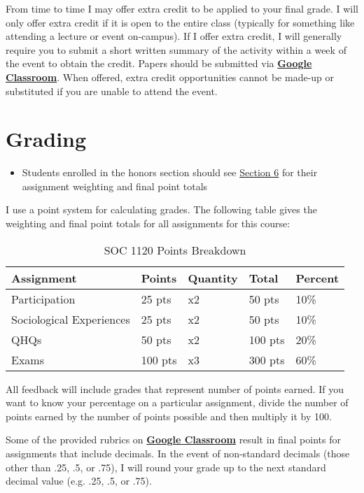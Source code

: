 \documentclass[]{book}
\newenvironment{rmdblock}[1]
  {\begin{shaded*}
  \begin{itemize}
  \renewcommand{\labelitemi}{
    \raisebox{-.7\height}[0pt][0pt]{
      {\setkeys{Gin}{width=3em,keepaspectratio}\texttt{[image: images/\#1]}}
    }
  }
  \item
  }
  {
  \end{itemize}
  \end{shaded*}
  }
\newenvironment{rmdwarning}
  {\begin{rmdblock}{warning}}
  {\end{rmdblock}}
\begin{document}
From time to time I may offer extra credit to be applied to your final grade. I will only offer extra credit if it is open to the entire class (typically for something like attending a lecture or event on-campus). If I offer extra credit, I will generally require you to submit a short written summary of the activity within a week of the event to obtain the credit. Papers should be submitted via \textbf{\href{https://classroom.google.com}{Google Classroom}}. When offered, extra credit opportunities cannot be made-up or substituted if you are unable to attend the event.

\hypertarget{grading}{%
\section{Grading}\label{grading}}

\begin{rmdwarning}
Students enrolled in the honors section should see
\href{/honors-overview.html}{Section 6} for their assignment weighting
and final point totals
\end{rmdwarning}

I use a point system for calculating grades. The following table gives the weighting and final point totals for all assignments for this course:

\begin{table}[t]

\caption{\label{tab:unnamed-chunk-7}SOC 1120 Points Breakdown}
\centering
\begin{tabular}{lllll}
\toprule
Assignment & Points & Quantity & Total & Percent\\
\midrule
Participation & 25 pts & x2 & 50 pts & 10\%\\
Sociological Experiences & 25 pts & x2 & 50 pts & 10\%\\
QHQs & 50 pts & x2 & 100 pts & 20\%\\
Exams & 100 pts & x3 & 300 pts & 60\%\\
\bottomrule
\end{tabular}
\end{table}

All feedback will include grades that represent number of points earned. If you want to know your percentage on a particular assignment, divide the number of points earned by the number of points possible and then multiply it by 100.

Some of the provided rubrics on \textbf{\href{https://classroom.google.com}{Google Classroom}} result in final points for assignments that include decimals. In the event of non-standard decimals (those other than .25, .5, or .75), I will round your grade up to the next standard decimal value (e.g. .25, .5, or .75).
\end{document}
